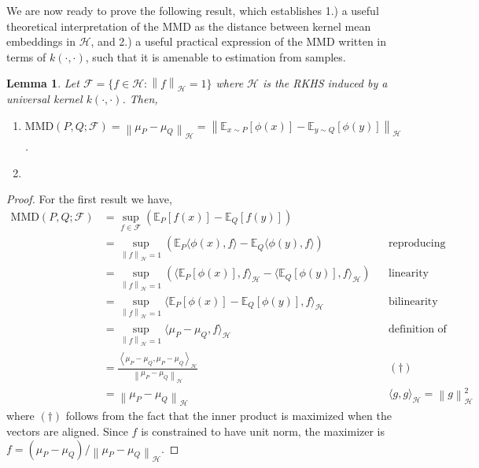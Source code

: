 \documentclass[12pt]{article}
\newcommand*{\norm}[1]{\left\lVert#1\right\rVert}
\newcommand{\E}{\mathbb{E}}
\newcommand{\featureMap}{\phi}
\newcommand{\RKHS}{\mathcal{H}}
\newcommand{\Ker}{k}
\newcommand{\meanEmb}[1]{\mu_{#1}}
\newcommand{\MMD}{\text{MMD}}
\newcommand{\MMDSpace}{\mathcal{F}}
\newtheorem{lemma}{Lemma}
\begin{document}
We are now ready to prove the following result, which establishes 1.) a useful theoretical interpretation of the MMD as the distance between kernel mean embeddings in 
$\RKHS$, and 2.) a useful practical expression of the MMD written in terms of $\Ker(\cdot, \cdot)$, such that it is amenable to estimation from samples. 

\begin{lemma} 
Let $\MMDSpace = \{f \in \RKHS: \norm{f}_{\RKHS} = 1\}$ where $\RKHS$ is the RKHS induced by a universal kernel $\Ker(\cdot, \cdot)$. Then, 
\begin{enumerate}
\item $\MMD(P, Q; \MMDSpace) = \norm{\meanEmb{P} - \meanEmb{Q}}_{\RKHS} = \norm{\E_{x \sim P}[\featureMap(x)] - \E_{y \sim Q}[\featureMap(y)]}_{\RKHS}$.
\item 
\end{enumerate}
\end{lemma}

\begin{proof}
For the first result we have, 
\begin{align*}
\MMD(P, Q; \MMDSpace) 
&= \sup_{f \in \MMDSpace} \left(\E_P[f(x)] - \E_Q[f(y)]\right) \\
&= \sup_{\norm{f}_{\RKHS} = 1} \left(\E_P \langle \featureMap(x), f \rangle - \E_Q \langle \featureMap(y), f \rangle\right) &&\text{reproducing property} \\
&= \sup_{\norm{f}_{\RKHS} = 1} \left(\langle \E_P [\featureMap(x)], f \rangle_{\RKHS} - \langle \E_Q [\featureMap(y)], f \rangle_{\RKHS} \right) &&\text{linearity} \\
&= \sup_{\norm{f}_{\RKHS} = 1} \langle \E_P [\featureMap(x)] - \E_Q [\featureMap(y)], f \rangle_{\RKHS}  &&\text{bilinearity} \\
&= \sup_{\norm{f}_{\RKHS} = 1} \langle \meanEmb{P} - \meanEmb{Q}, f \rangle_{\RKHS}  &&\text{definition of mean embedding} \\
&= \frac{\left\langle \meanEmb{P} - \meanEmb{Q},  \meanEmb{P} - \meanEmb{Q} \right\rangle_{\RKHS}}{\norm{ \meanEmb{P} - \meanEmb{Q}}_{\RKHS}}  &&(\dagger) \\
&= \norm{ \meanEmb{P} - \meanEmb{Q}}_{\RKHS} &&\langle g, g \rangle_{\RKHS} = \norm{g}^2_{\RKHS}
\end{align*}
where $(\dagger)$ follows from the fact that the inner product is maximized when the vectors are aligned. Since $f$ is constrained to have unit norm, the 
maximizer is $f = (\meanEmb{P} - \meanEmb{Q}) / \norm{\meanEmb{P} - \meanEmb{Q}}_{\RKHS}$.

\end{proof}
\end{document}
